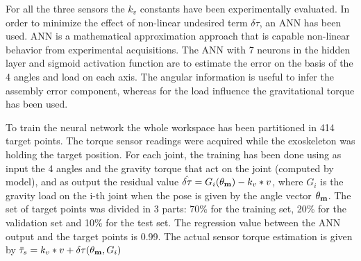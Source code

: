{%
}
\DIFdelend %
%
%
For all the three sensors the $k_v$ constants have been experimentally evaluated. In order to minimize the effect of non-linear undesired term $\delta\tau$,  an ANN has been used. ANN is a mathematical approximation approach that is capable \DIFdelbegin {}\DIFdelend \DIFaddbegin {}\DIFaddend non-linear behavior from experimental acquisitions. The ANN with 7 neurons in the hidden layer and sigmoid activation function are \DIFdelbegin {}\DIFdelend \DIFaddbegin {}\DIFaddend to estimate the error on the basis of the 4 angles and load on each axis. The angular information is useful to infer the assembly error component, whereas for the load influence the gravitational torque has been used. 
\par To train the neural network the whole workspace has been partitioned in 414 target points. The torque sensor readings were acquired while the exoskeleton was holding the target position. For each joint, the training has been done using as input the 4 angles and the gravity torque that act on the joint (computed by model), and as output the residual value $\hat{\delta\tau} = G_i(\mathbf{\theta_m}) - k_v * v$, where $G_i$ is the gravity load on the i-th joint when the pose is given by the angle vector $\mathbf{\theta_m}$. The set of target points was divided in 3 parts: 70\% for the training set, 20\% for the validation set and 10\% for the test set. The regression value between the ANN output and the target points is 0.99.
The actual sensor torque estimation is given by $\bar{\tau}_s = k_v * v + \delta\tau(\mathbf{\theta_m},G_i)$\DIFdelbegin {}%
